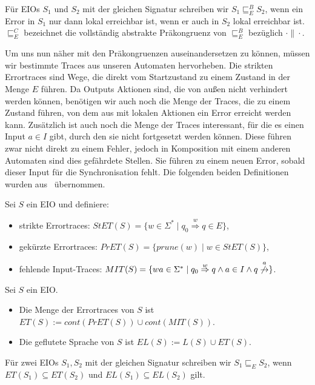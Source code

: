 \begin{Def}
  Für EIOs $S_1$ und $S_2$ mit der gleichen Signatur schreiben wir $S_1\sqsubseteq
  _E^ B S_2$, wenn ein Error in $S_1$ nur dann lokal erreichbar ist, wenn er
  auch in $S_2$ lokal erreichbar ist.\\
  $\sqsubseteq _E^C$ bezeichnet die vollständig abstrakte Präkongruenz von
  $\sqsubseteq _E^B$ bezüglich $\cdot\|\cdot$.
\end{Def}

Um uns nun näher mit den Präkongruenzen auseinandersetzen zu können, müssen wir bestimmte Traces
aus unseren Automaten hervorheben. Die strikten Errortraces sind Wege, die
direkt vom Startzustand zu einem Zustand in der Menge $E$ führen. Da Outputs Aktionen
sind, die von außen nicht verhindert werden können, benötigen wir auch noch die
Menge der Traces, die zu einem Zustand führen, von dem aus mit lokalen Aktionen
ein Error erreicht werden kann. Zusätzlich ist auch noch die Menge der Traces
interessant, für die es einen Input $a\in I$ gibt, durch den sie nicht
fortgesetzt werden können. Diese führen zwar nicht
direkt zu einem Fehler, jedoch in Komposition mit einem anderen Automaten sind
dies gefährdete Stellen. Sie führen zu einem neuen Error, sobald dieser Input
für die Synchronisation fehlt. Die folgenden beiden Definitionen wurden
aus~\cite{Vogler2014EIO} übernommen.

\begin{Def}[Errortraces]
  \label{DefErrortraces}
  Sei $S$ ein EIO und definiere:
  \begin{itemize}
    \item strikte Errortraces: $StET(S)=\{w\in\Sigma
      ^*\mid q_0\overset{w}{\Rightarrow}q\in E\}$,
    \item gekürzte Errortraces: $PrET(S)=\{prune(w)\mid w\in StET(S)\}$,
    \item fehlende Input-Traces: $MIT(S)=\{wa\in\Sigma ^*\mid
      q_0\overset{w}{\Rightarrow}q\wedge a\in I\wedge
    q\overset{a}{\not{\hspace{-0.1cm}\rightarrow}}\}$.
  \end{itemize}
\end{Def}

\begin{Def}
  \label{DefETEL}
  Sei $S$ ein EIO.
  \begin{itemize}
    \item Die Menge der Errortraces von $S$ ist $ET(S):=cont(PrET(S))\cup
      cont(MIT(S))$.
    \item Die geflutete Sprache von $S$ ist $EL(S):=L(S)\cup ET(S)$.
  \end{itemize}
  Für zwei EIOs $S_1, S_2$ mit der gleichen Signatur schreiben wir
  $S_1\sqsubseteq _E S_2$, wenn $ET(S_1)\subseteq ET(S_2)$ und
  $EL(S_1)\subseteq EL(S_2)$ gilt.
\end{Def}

